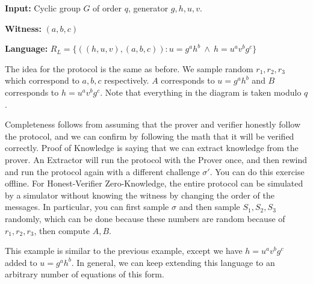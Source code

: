\begin{example}

\textbf{Input:} Cyclic group $G$ of order $q$, generator $g, h, u, v$.

\textbf{Witness:} $(a, b, c)$

\textbf{Language:} $R_L = \{ ((h, u, v), (a, b, c)): u = g^a h^b\ \wedge\ h = u^a v^b g^c\}$

The idea for the protocol is the same as before. We sample random $r_1, r_2, r_3$ which correspond to $a, b, c$ respectively. $A$ corresponds to $u = g^ah^b$ and $B$ corresponds to $h = u^a v^b g^c$. Note that everything in the diagram is taken modulo $q$.


Completeness follows from assuming that the prover and verifier honestly follow the protocol, and we can confirm by following the math that it will be verified correctly. Proof of Knowledge is saying that we can extract knowledge from the prover. An Extractor will run the protocol with the Prover once, and then rewind and run the protocol again with a different challenge $\sigma '$. You can do this exercise offline. For Honest-Verifier Zero-Knowledge, the entire protocol can be simulated by a simulator without knowing the witness by changing the order of the messages. In particular, you can first sample $\sigma$ and then sample $S_1, S_2, S_3$ randomly, which can be done because these numbers are random because of $r_1, r_2, r_3$, then compute $A, B$.

This example is similar to the previous example, except we have $h = u^a v^b g^c$ added to $u = g^ah^b$. In general, we can keep extending this language to an arbitrary number of equations of this form. 

\end{example}